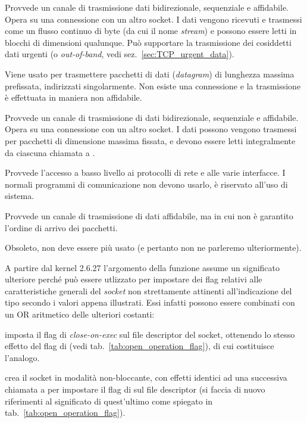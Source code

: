 \begin{basedescript}{\desclabelwidth{2.0cm}\desclabelstyle{\nextlinelabel}}
\item[\constd{SOCK\_STREAM}] Provvede un canale di trasmissione dati
  bidirezionale, sequenziale e affidabile. Opera su una connessione con un
  altro socket. I dati vengono ricevuti e trasmessi come un flusso continuo di
  byte (da cui il nome \textit{stream}) e possono essere letti in blocchi di
  dimensioni qualunque. Può supportare la trasmissione dei cosiddetti dati
  urgenti (o \textit{out-of-band}, vedi sez.~\ref{sec:TCP_urgent_data}).
\item[\constd{SOCK\_DGRAM}] Viene usato per trasmettere pacchetti di dati
  (\textit{datagram}) di lunghezza massima prefissata, indirizzati
  singolarmente. Non esiste una connessione e la trasmissione è effettuata in
  maniera non affidabile.
\item[\constd{SOCK\_SEQPACKET}] Provvede un canale di trasmissione di dati
  bidirezionale, sequenziale e affidabile. Opera su una connessione con un
  altro socket. I dati possono vengono trasmessi per pacchetti di dimensione
  massima fissata, e devono essere letti integralmente da ciascuna chiamata a
  .
\item[\constd{SOCK\_RAW}] Provvede l'accesso a basso livello ai protocolli di
  rete e alle varie interfacce. I normali programmi di comunicazione non
  devono usarlo, è riservato all'uso di sistema.
\item[\constd{SOCK\_RDM}] Provvede un canale di trasmissione di dati
  affidabile, ma in cui non è garantito l'ordine di arrivo dei pacchetti.
\item[\constd{SOCK\_PACKET}] Obsoleto, non deve essere più usato (e pertanto
  non ne parleremo ulteriormente).
\end{basedescript}

A partire dal kernel 2.6.27 l'argomento  della funzione
 assume un significato ulteriore perché può essere utlizzato per
impostare dei flag relativi alle caratteristiche generali del \textit{socket}
non strettamente attinenti all'indicazione del tipo secondo i valori appena
illustrati. Essi infatti possono essere combinati con un OR aritmetico delle
ulteriori costanti:
\begin{basedescript}{\desclabelwidth{2.5cm}\desclabelstyle{\nextlinelabel}}
\item[\constd{SOCK\_CLOEXEC}] imposta il flag di \textit{close-on-exec} sul
  file descriptor del socket, ottenendo lo stesso effetto del flag
   di  (vedi tab.~\ref{tab:open_operation_flag}),
  di cui costituisce l'analogo.

\item[\constd{SOCK\_NONBLOCK}] crea il socket in modalità non-bloccante, con
  effetti identici ad una successiva chiamata a  per impostare il
  flag di  sul file descriptor (si faccia di nuovo
  riferimenti al significato di quest'ultimo come spiegato in
  tab.~\ref{tab:open_operation_flag}).
\end{basedescript}

